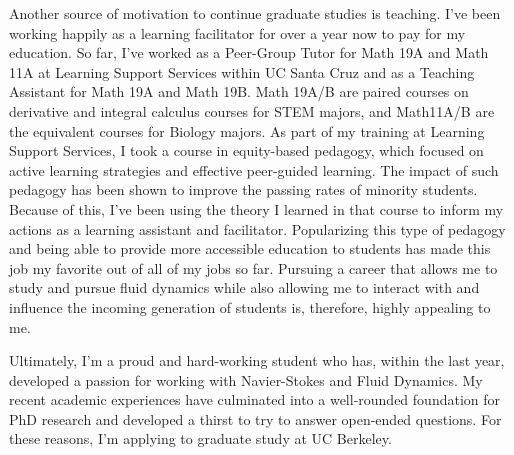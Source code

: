 \documentclass{article}
\begin{document}
Another source of motivation to continue graduate studies is teaching. I've been working happily as a learning facilitator for over a year now to pay for my education. So far, I've worked as a Peer-Group Tutor for Math 19A and Math 11A at Learning Support Services within UC Santa Cruz and as a Teaching Assistant for Math 19A and Math 19B. Math 19A/B are paired courses on derivative and integral calculus courses for STEM majors, and Math11A/B are the equivalent courses for Biology majors. As part of my training at Learning Support Services, I took a course in equity-based pedagogy, which focused on active learning strategies and effective peer-guided learning. The impact of such pedagogy has been shown to improve the passing rates of minority students. Because of this, I've been using the theory I learned in that course to inform my actions as a learning assistant and facilitator. Popularizing this type of pedagogy and being able to provide more accessible education to students has made this job my favorite out of all of my jobs so far. Pursuing a career that allows me to study and pursue fluid dynamics while also allowing me to interact with and influence the incoming generation of students is, therefore, highly appealing to me. 

Ultimately, I'm a proud and hard-working student who has, within the last year, developed a passion for working with Navier-Stokes and Fluid Dynamics. My recent academic experiences have culminated into a well-rounded foundation for PhD research and developed a thirst to try to answer open-ended questions. For these reasons, I'm applying to graduate study at UC Berkeley. 

\end{document}

